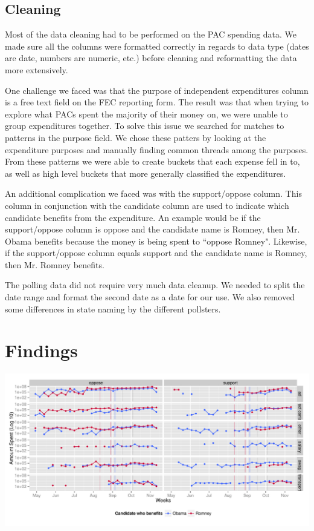 \documentclass[11pt]{article}\usepackage{graphicx, color}
\newenvironment{knitrout}{}{} %
\begin{document}
\subsection{Cleaning}
Most of the data cleaning had to be performed on the PAC spending data. We made sure all the columns were formatted correctly in regards to data type (dates are date, numbers are numeric, etc.) before cleaning and reformatting the data more extensively. 

One challenge we faced was that the purpose of independent expenditures column is a free text field on the FEC reporting form. The result was that when trying to explore what PACs spent the majority of their money on, we were unable to group expenditures together. To solve this issue we searched for matches to patterns in the purpose field. We chose these patters by looking at the expenditure purposes and manually finding common threads among the purposes. From these patterns we were able to create buckets that each expense fell in to, as well as high level buckets that more generally classified the expenditures.

An additional complication we faced was with the support/oppose column. This column in conjunction with the candidate column are used to indicate which candidate benefits from the expenditure. An example would be if the support/oppose column is oppose and the candidate name is Romney, then Mr. Obama benefits because the money is being spent to ``oppose Romney". Likewise, if the support/oppose column equals support and the candidate name is Romney, then Mr. Romney benefits.

The polling data did not require very much data cleanup. We needed to split the date range and format the second date as a date for our use. We also removed some differences in state naming by the different pollsters.


\section{Findings}
\begin{knitrout}
\color{fgcolor}

{\centering \includegraphics[width=\textwidth]{figure/temporal_plot} 

}


\end{knitrout}
\end{document}
